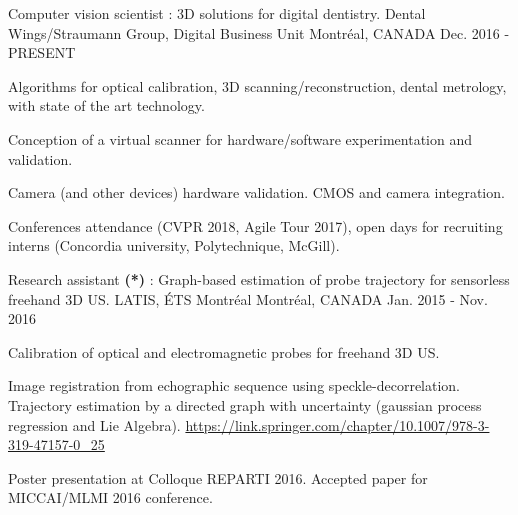 


\begin{cventries}


\cventry
{Computer vision scientist : 3D solutions for digital dentistry.}%
{Dental Wings/Straumann Group, Digital Business Unit} %
{Montréal, CANADA} %
{Dec. 2016 - PRESENT} %
{ %
\begin{cvitems}
\item {Algorithms for optical calibration, 3D scanning/reconstruction, dental metrology,  with state of the art technology.}
\item {Conception of a virtual scanner for hardware/software experimentation and validation.}
\item {Camera (and other devices) hardware validation. CMOS and camera integration.}
\item Conferences attendance (CVPR 2018, Agile Tour 2017), open days for recruiting interns (Concordia university, Polytechnique, McGill).
\end{cvitems}
}


\cventry
{Research assistant \textbf{(*)} : Graph-based estimation of probe trajectory for sensorless freehand 3D US.}%
{LATIS, ÉTS Montréal} %
{Montréal, CANADA} %
{Jan. 2015 - Nov. 2016} %
{ %
\begin{cvitems}
\item {Calibration of optical and electromagnetic probes for freehand 3D US.}
\item {Image registration from echographic sequence using speckle-decorrelation. Trajectory estimation by a directed graph with uncertainty (gaussian process regression and Lie Algebra). \url{https://link.springer.com/chapter/10.1007/978-3-319-47157-0_25}}
\item {Poster presentation at Colloque REPARTI 2016. Accepted paper for MICCAI/MLMI 2016 conference.}
\end{cvitems}
}


\end{cventries}
